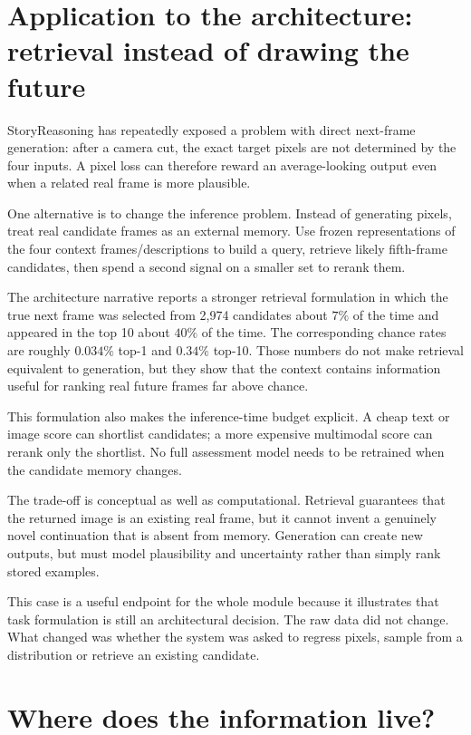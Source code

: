 \section{Application to the architecture: retrieval instead of drawing the future}

\begin{architecturebox}
StoryReasoning has repeatedly exposed a problem with direct next-frame generation: after a camera cut, the exact target pixels are not determined by the four inputs. A pixel loss can therefore reward an average-looking output even when a related real frame is more plausible.

One alternative is to change the inference problem. Instead of generating pixels, treat real candidate frames as an external memory. Use frozen representations of the four context frames/descriptions to build a query, retrieve likely fifth-frame candidates, then spend a second signal on a smaller set to rerank them.

The architecture narrative reports a stronger retrieval formulation in which the true next frame was selected from 2,974 candidates about \(7\%\) of the time and appeared in the top 10 about \(40\%\) of the time. The corresponding chance rates are roughly \(0.034\%\) top-1 and \(0.34\%\) top-10. Those numbers do not make retrieval equivalent to generation, but they show that the context contains information useful for ranking real future frames far above chance.

This formulation also makes the inference-time budget explicit. A cheap text or image score can shortlist candidates; a more expensive multimodal score can rerank only the shortlist. No full assessment model needs to be retrained when the candidate memory changes.

The trade-off is conceptual as well as computational. Retrieval guarantees that the returned image is an existing real frame, but it cannot invent a genuinely novel continuation that is absent from memory. Generation can create new outputs, but must model plausibility and uncertainty rather than simply rank stored examples.
\end{architecturebox}

This case is a useful endpoint for the whole module because it illustrates that task formulation is still an architectural decision. The raw data did not change. What changed was whether the system was asked to regress pixels, sample from a distribution or retrieve an existing candidate.

\section{Where does the information live?}

